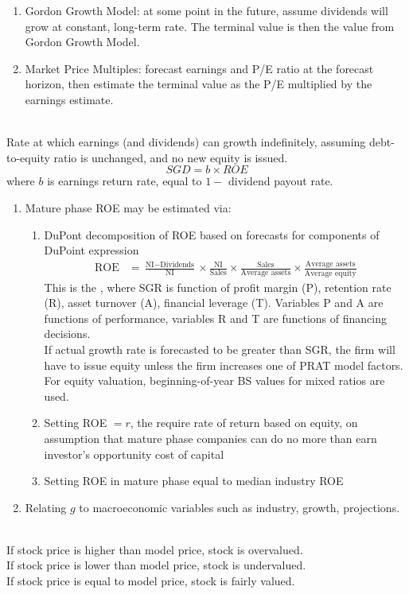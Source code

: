 \begin{method} 
\begin{enumerate}[label=\roman*.]
\setlength{\itemsep}{0pt}
\item Gordon Growth Model: at some point in the future, assume dividends will grow at constant, long-term rate. The terminal value is then the value from Gordon Growth Model.
\item Market Price Multiples: forecast earnings and P/E ratio at the forecast horizon, then estimate the terminal value as the P/E multiplied by the earnings estimate.
\end{enumerate}
\end{method}

\begin{method} \\
Rate at which earnings (and dividends) can growth indefinitely, assuming debt-to-equity ratio is unchanged, and no new equity is issued.
\begin{equation}
SGD = b \times ROE \nonumber
\end{equation}
where $b$ is earnings return rate, equal to $1 - $ dividend payout rate.
\begin{enumerate}[label=\roman*.]
\setlength{\itemsep}{0pt}
\item Mature phase ROE may be estimated via:
\begin{enumerate}[label=\arabic*.]
\setlength{\itemsep}{0pt}
\item DuPont decomposition of ROE based on forecasts for components of DuPoint expression
\begin{align}
\text{ROE} &= \frac{\text{NI} - \text{Dividends}}{\text{NI}} \times \frac{\text{NI}}{\text{Sales}} \times \frac{\text{Sales}}{\text{Average assets}} \times \frac{\text{Average assets}}{\text{Average equity}} \nonumber
\end{align}
This is the , where SGR is function of profit margin (P), retention rate (R), asset turnover (A), financial leverage (T). Variables P and A are functions of performance, variables R and T are functions of financing decisions.\\
If actual growth rate is forecasted to be greater than SGR, the firm will have to issue equity unless the firm increases one of PRAT model factors.\\
For equity valuation, beginning-of-year BS values for mixed ratios are used.
\item Setting ROE $=r$, the require rate of return based on equity, on assumption that mature phase companies can do no more than earn investor's opportunity cost of capital
\item Setting ROE in mature phase equal to median industry ROE
\end{enumerate}
\item Relating $g$ to macroeconomic variables such as industry, growth, projections.
\end{enumerate}
\end{method}

\begin{definition} \\
If stock price is higher than model price, stock is overvalued.\\
If stock price is lower than model price, stock is undervalued.\\
If stock price is equal to model price, stock is fairly valued.
\end{definition}